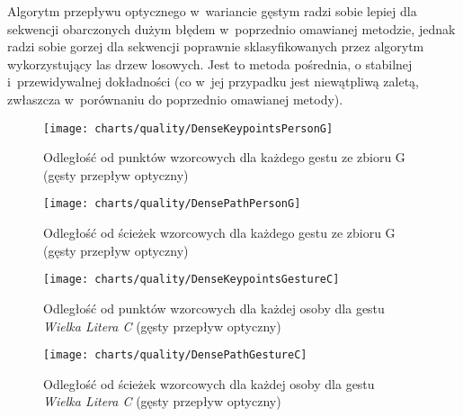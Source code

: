     Algorytm przepływu optycznego w~wariancie gęstym radzi sobie lepiej dla sekwencji obarczonych dużym błędem w~poprzednio omawianej metodzie, jednak radzi sobie gorzej dla sekwencji poprawnie sklasyfikowanych przez algorytm wykorzystujący las drzew losowych. Jest to metoda pośrednia, o stabilnej i~przewidywalnej dokładności (co w~jej przypadku jest niewątpliwą zaletą, zwłaszcza w~porównaniu do poprzednio omawianej metody).

    \newpage
      \begin{figure}[!ht]
        \centering
        \texttt{[image: charts/quality/DenseKeypointsPersonG]}
        \caption[Odległość od punktów wzorcowych dla każdego gestu (gęsty przepływ optyczny)]
                {Odległość od punktów wzorcowych dla każdego gestu ze zbioru G (gęsty przepływ optyczny)}
        \label{fig:DenseKeypointsPersonG}
      \end{figure}

      \begin{figure}[!ht]
        \centering
        \texttt{[image: charts/quality/DensePathPersonG]}
        \caption[Odległość od ścieżek wzorcowych dla każdego gestu (gęsty przepływ optyczny)]
                {Odległość od ścieżek wzorcowych dla każdego gestu ze zbioru G\\(gęsty przepływ optyczny)}
        \label{fig:DensePathPersonG}
      \end{figure}

    \newpage
      \begin{figure}[!ht]
        \centering
        \texttt{[image: charts/quality/DenseKeypointsGestureC]}
        \caption[Odległość od punktów wzorcowych dla każdej osoby dla gestu C (gęsty przepływ optyczny)]
                {Odległość od punktów wzorcowych dla każdej osoby dla gestu\\\textit{Wielka Litera C} (gęsty przepływ optyczny)}
        \label{fig:DenseKeypointsGestureC}
      \end{figure}

      \begin{figure}[!ht]
        \centering
        \texttt{[image: charts/quality/DensePathGestureC]}
        \caption[Odległość od ścieżek wzorcowych dla każdej osoby dla gestu C (gęsty przepływ optyczny)]
                {Odległość od ścieżek wzorcowych dla każdej osoby dla gestu\\\textit{Wielka Litera C} (gęsty przepływ optyczny)}
        \label{fig:DensePathGestureC}
      \end{figure}

